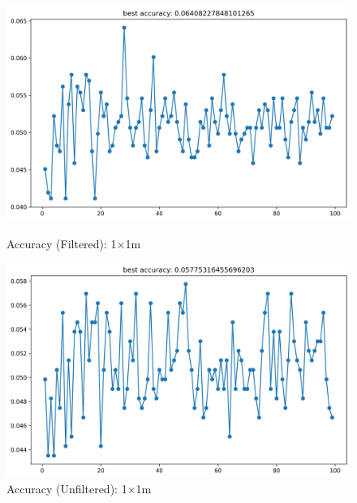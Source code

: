 \documentclass[runningheads]{llncs}
\begin{document}
\begin{figure}[H]
	\centering
	\begin{minipage}{0.49\textwidth}
		\centering
		\includegraphics[width=\textwidth]{figures/filtered/xgbrf_acc_1.png}
		\caption*{Accuracy (Filtered): 1×1m}
	\end{minipage}
	\hfill
	\begin{minipage}{0.49\textwidth}
		\centering
		\includegraphics[width=\textwidth]{figures/unfiltered/xgbrf_acc_1.png}
		\caption*{Accuracy (Unfiltered): 1×1m}
	\end{minipage}
\end{figure}
\end{document}
